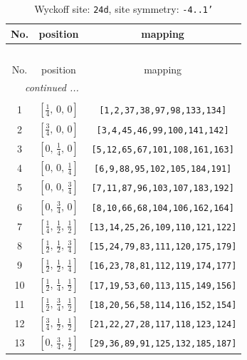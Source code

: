 \documentclass[fleqn,8pt]{jsarticle}
\begin{document}
\begin{longtable}{ccc}
\caption{Wyckoff site: {\tt 24d}, site symmetry: {\tt -4..1'}}
 \\
 \hline \hline
No. & position & mapping \\ \hline \endfirsthead

\multicolumn{2}{l}{\tablename\ \thetable{}} \\
 \hline \hline
No. & position & mapping \\ \hline \endhead

 \hline \hline
\multicolumn{2}{r}{\footnotesize\it continued ...} \\ \endfoot

 \hline \hline
\multicolumn{2}{r}{} \\ \endlastfoot

1 & $\left[ \frac{1}{4},\, 0,\, 0 \right]$ & {\tt [1,2,37,38,97,98,133,134]} \\ \hline
2 & $\left[ \frac{3}{4},\, 0,\, 0 \right]$ & {\tt [3,4,45,46,99,100,141,142]} \\ \hline
3 & $\left[ 0,\, \frac{1}{4},\, 0 \right]$ & {\tt [5,12,65,67,101,108,161,163]} \\ \hline
4 & $\left[ 0,\, 0,\, \frac{1}{4} \right]$ & {\tt [6,9,88,95,102,105,184,191]} \\ \hline
5 & $\left[ 0,\, 0,\, \frac{3}{4} \right]$ & {\tt [7,11,87,96,103,107,183,192]} \\ \hline
6 & $\left[ 0,\, \frac{3}{4},\, 0 \right]$ & {\tt [8,10,66,68,104,106,162,164]} \\ \hline
7 & $\left[ \frac{1}{4},\, \frac{1}{2},\, \frac{1}{2} \right]$ & {\tt [13,14,25,26,109,110,121,122]} \\ \hline
8 & $\left[ \frac{1}{2},\, \frac{1}{2},\, \frac{3}{4} \right]$ & {\tt [15,24,79,83,111,120,175,179]} \\ \hline
9 & $\left[ \frac{1}{2},\, \frac{1}{2},\, \frac{1}{4} \right]$ & {\tt [16,23,78,81,112,119,174,177]} \\ \hline
10 & $\left[ \frac{1}{2},\, \frac{1}{4},\, \frac{1}{2} \right]$ & {\tt [17,19,53,60,113,115,149,156]} \\ \hline
11 & $\left[ \frac{1}{2},\, \frac{3}{4},\, \frac{1}{2} \right]$ & {\tt [18,20,56,58,114,116,152,154]} \\ \hline
12 & $\left[ \frac{3}{4},\, \frac{1}{2},\, \frac{1}{2} \right]$ & {\tt [21,22,27,28,117,118,123,124]} \\ \hline
13 & $\left[ 0,\, \frac{3}{4},\, \frac{1}{2} \right]$ & {\tt [29,36,89,91,125,132,185,187]} \\ \hline

\end{longtable}
\end{document}
